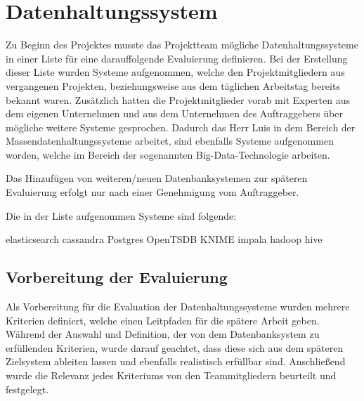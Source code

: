 \section{Datenhaltungssystem}
\label{sec:datenhaltungssystem}
Zu Beginn des Projektes musste das Projektteam mögliche Datenhaltungssysteme in
einer Liste für eine darauffolgende Evaluierung definieren. Bei der Erstellung
dieser Liste wurden Systeme aufgenommen, welche den Projektmitgliedern aus
vergangenen Projekten, beziehungsweise aus dem täglichen Arbeitstag bereits
bekannt waren. Zusätzlich hatten die Projektmitglieder vorab mit Experten aus
dem eigenen Unternehmen und aus dem Unternehmen des Auftraggebers über mögliche
weitere Systeme gesprochen. Dadurch das Herr Luis in dem Bereich der
Massendatenhaltungssysteme arbeitet, sind ebenfalls Systeme aufgenommen worden,
welche im Bereich der sogenannten Big-Data-Technologie arbeiten.

Das Hinzufügen von weiteren/neuen Datenbanksystemen zur späteren
Evaluierung erfolgt nur nach einer Genehmigung vom Auftraggeber.

Die in der Liste aufgenommen Systeme sind folgende:

\begin{outline}
  \1 elasticsearch
  \1 cassandra
  \1 Postgres
  \1 OpenTSDB
  \1 KNIME
  \1 impala
  \1 hadoop
  \1 hive
\end{outline}
\nl%

\subsection{Vorbereitung der Evaluierung}
\label{subsec:DBS_vorbereitung_der_evaluierung}
Als Vorbereitung für die Evaluation der Datenhaltungssysteme wurden mehrere
Kriterien definiert, welche einen Leitpfaden für die spätere Arbeit geben.
Während der Auswahl und Definition, der von dem Datenbanksystem zu erfüllenden
Kriterien, wurde darauf geachtet, dass diese sich aus dem späteren Zielsystem
ableiten lassen und ebenfalls realistisch erfüllbar sind. Anschließend wurde
die Relevanz jedes Kriteriums von den Teammitgliedern beurteilt und festgelegt.

